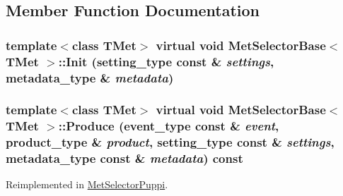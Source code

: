 \subsection{Member Function Documentation}
\hypertarget{classMetSelectorBase_a727ae5cae998adf7943885fd32417f68}{
\subsubsection[{Init}]{\setlength{\rightskip}{0pt plus 5cm}template$<$class TMet$>$ virtual void {\bf MetSelectorBase}$<$ TMet $>$::Init (setting\_\-type const \& {\em settings}, \/  metadata\_\-type \& {\em metadata})}}
\label{classMetSelectorBase_a727ae5cae998adf7943885fd32417f68}
\hypertarget{classMetSelectorBase_a61da28f5d705a0e0a620879c7bf6a61c}{
\subsubsection[{Produce}]{\setlength{\rightskip}{0pt plus 5cm}template$<$class TMet$>$ virtual void {\bf MetSelectorBase}$<$ TMet $>$::Produce (event\_\-type const \& {\em event}, \/  product\_\-type \& {\em product}, \/  setting\_\-type const \& {\em settings}, \/  metadata\_\-type const \& {\em metadata}) const}}
\label{classMetSelectorBase_a61da28f5d705a0e0a620879c7bf6a61c}


Reimplemented in \hyperlink{classMetSelectorPuppi_a8271850e0ac5dfdfe20e403947f87c3d}{MetSelectorPuppi}.

